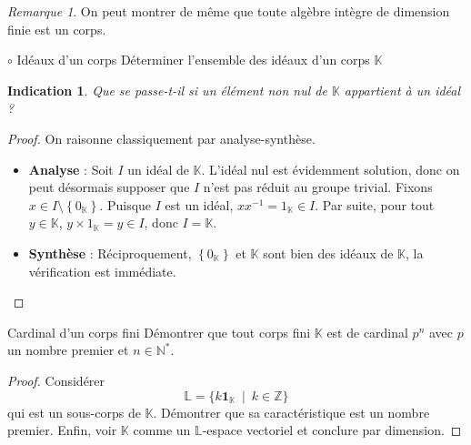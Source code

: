 \documentclass[french,a4paper]{article}
\newcommand{\N}{\mathbb{N}}
\newcommand{\Z}{\mathbb{Z}}
\newcommand{\K}{\mathbb{K}}
\renewcommand{\L}{\mathbb{L}}
\newcommand{\st}{^*}
\newcommand{\inv}{^{-1}}
\theoremstyle{plain}
\newtheorem*{ind}{Indication}
\theoremstyle{definition}
\theoremstyle{remark}
\newtheorem*{rmq}{Remarque}
\begin{document}
\begin{rmq}
	On peut montrer de même que toute algèbre intègre de dimension finie est un corps.
\end{rmq}

\begin{ex}[Morlot]{$\circ$ Idéaux d'un corps}
	Déterminer l'ensemble des idéaux d'un corps $\K$
\end{ex}

\begin{ind}
	Que se passe-t-il si un élément non nul de $\K$ appartient à un idéal ?
\end{ind}

\begin{proof}
	On raisonne classiquement par analyse-synthèse.
	\begin{itemize}
		\item \textbf{Analyse} : Soit $I$ un idéal de $\K$. L'idéal nul est évidemment solution, donc on peut désormais supposer que $I$ n'est pas réduit au groupe trivial. Fixons $x \in I\setminus\left\{0_\K \right\}$. Puisque $I$ est un idéal, $xx\inv=1_\K \in I$. Par suite, pour tout $y \in\K$, $y\times 1_\K=y \in I$, donc $I=\K$.
		\item \textbf{Synthèse} : Réciproquement, $\left\{0_\K \right\}$ et $\K$ sont bien des idéaux de $\K$, la vérification est immédiate.
	\end{itemize}
\end{proof}

\begin{ex}{Cardinal d'un corps fini}
	Démontrer que tout corps fini $\K$ est de cardinal $p^n$ avec $p$ un nombre premier et $n\in\N\st$.
\end{ex}

\begin{proof}
	Considérer $$\L=\{k\mathbf{1}_\K \ \mid \ k\in\Z\}$$ qui est un sous-corps de $\K$. Démontrer que sa caractéristique est un nombre premier. Enfin, voir $\K$ comme un $\L$-espace vectoriel et conclure par dimension.
\end{proof}
\end{document}
